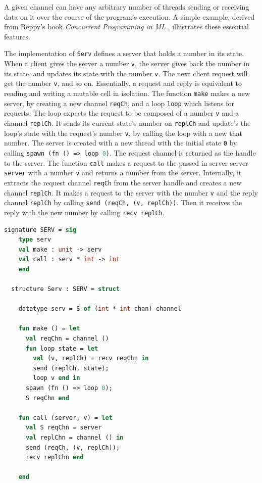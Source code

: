 \documentclass{article}
\begin{document}
A given channel can have any arbitrary number of threads sending or receiving data on it over
the course of the program's execution. A simple example, derived from Reppy's book
\textit{Concurrent Programming in ML} \cite{concurrent_ml}, illustrates these essential
features.

The implementation of \lstinline{Serv} defines a server that holds a number in its state.
When a client gives the server a number \lstinline{v}, the server gives back the number in
its state, and updates its state with the number \lstinline{v}.  The next client request will
get the number \lstinline{v}, and so on. Essentially, a request and reply is equivalent
to reading and writing a mutable cell in isolation. The function \lstinline{make} makes a new
server, by creating a new channel \lstinline{reqCh}, and a loop \lstinline{loop} which listens
for requests. The loop expects the request to be composed of a number \lstinline{v} and a
channel \lstinline{replCh}. It sends its current state's number on \lstinline{replCh} and
update's the loop's state with the request's number \lstinline{v}, by calling the loop with a
new that number. The server is created with a new thread with the initial state \lstinline{0}
by calling \lstinline[language=ML]{spawn (fn () => loop 0)}. The request channel is returned
as the handle to the server.  The function \lstinline{call} makes a request to the passed in
server server \lstinline{server} with a number \lstinline{v} and returns a number from the
server. Internally, it extracts the request channel \lstinline{reqCh} from the
server handle and creates a new channel \lstinline{replCh}. It makes a request to the server
with the number \lstinline{v} and the reply channel \lstinline{replCh} by calling
\lstinline{send (reqCh, (v, replCh))}. Then it receives the reply with the new number by
calling \lstinline{recv replCh}.


\begin{lstlisting}[language=ML, escapechar=\%]
  signature SERV = sig 
    type serv
    val make : unit -> serv
    val call : serv * int -> int
    end

  structure Serv : SERV = struct 

    datatype serv = S of (int * int chan) channel 

    fun make () = let 
      val reqChn = channel ()
      fun loop state = let
        val (v, replCh) = recv reqChn in 
        send (replCh, state);
        loop v end in
      spawn (fn () => loop 0);
      S reqChn end 

    fun call (server, v) = let 
      val S reqChn = server
      val replChn = channel () in 
      send (reqCh, (v, replCh));
      recv replChn end

    end
  \end{lstlisting}
\end{document}
